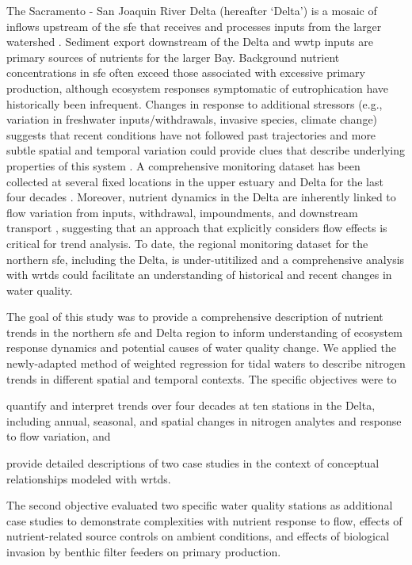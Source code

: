 \documentclass[journal = esthag, manuscript = article]{achemso}\usepackage[]{graphicx}\usepackage[]{color}
\begin{document}
The Sacramento - San Joaquin River Delta (hereafter `Delta') is a mosaic of inflows upstream of the \ac{sfe} that receives and processes inputs from the larger watershed \cite{Jassby00,Jassby02,Jassby08}. Sediment export downstream of the Delta and \ac{wwtp} inputs are primary sources of nutrients for the larger Bay.  Background nutrient concentrations in \ac{sfe} often exceed those associated with excessive primary production, although ecosystem responses symptomatic of eutrophication have historically been infrequent.  Changes in response to additional stressors (e.g., variation in freshwater inputs/withdrawals, invasive species, climate change) suggests that recent conditions have not followed past trajectories and more subtle spatial and temporal variation could provide clues that describe underlying properties of this system \cite{Cloern12b}.  A comprehensive monitoring dataset has been collected at several fixed locations in the upper estuary and Delta for the last four decades \cite{Jabusch16}.  Moreover, nutrient dynamics in the Delta are inherently linked to flow variation from inputs, withdrawal, impoundments, and downstream transport \cite{Novick15}, suggesting that an approach that explicitly considers flow effects is critical for trend analysis.  To date, the regional monitoring dataset for the northern \ac{sfe}, including the Delta, is under-utitilized and a comprehensive analysis with \ac{wrtds} could facilitate an understanding of historical and recent changes in water quality.

The goal of this study was to provide a comprehensive description of nutrient trends in the northern \ac{sfe} and Delta region to inform understanding of ecosystem response dynamics and potential causes of water quality change. We applied the newly-adapted method of weighted regression for tidal waters to describe nitrogen trends in  different spatial and temporal contexts. The specific objectives were to \begin{inparaenum}[1\upshape)]  
\item quantify and interpret trends over four decades at ten stations in the Delta, including annual, seasonal, and spatial changes in nitrogen analytes and response to flow variation, and
\item provide detailed descriptions of two case studies in the context of conceptual relationships modeled with \ac{wrtds}.
\end{inparaenum}
The second objective evaluated two specific water quality stations as additional case studies to demonstrate complexities with nutrient response to flow, effects of nutrient-related source controls on ambient conditions, and effects of biological invasion by benthic filter feeders on primary production.
\end{document}
